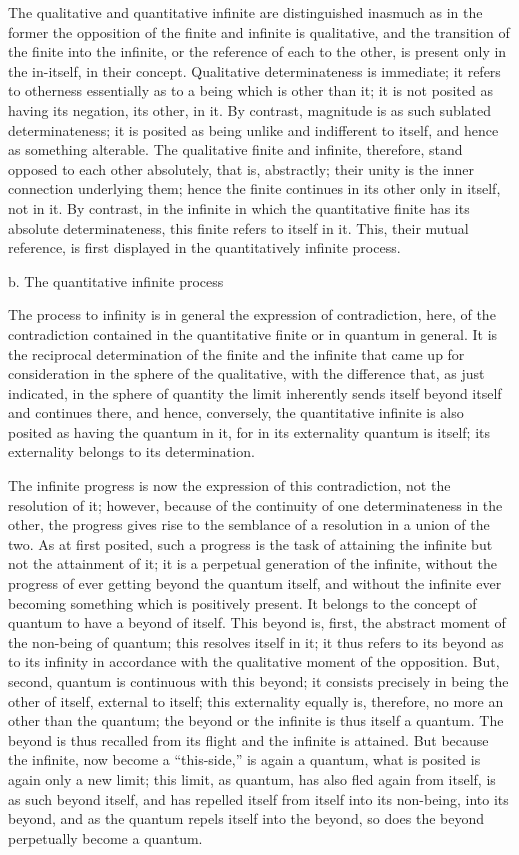 The qualitative and quantitative infinite are distinguished
inasmuch as in the former the opposition of
the finite and infinite is qualitative,
and the transition of the finite into the infinite,
or the reference of each to the other,
is present only in the in-itself, in their concept.
Qualitative determinateness is immediate;
it refers to otherness essentially as to
a being which is other than it;
it is not posited as having its negation, its other, in it.
By contrast, magnitude is as such sublated determinateness;
it is posited as being unlike and indifferent to itself,
and hence as something alterable.
The qualitative finite and infinite, therefore,
stand opposed to each other absolutely,
that is, abstractly;
their unity is the inner connection underlying them;
hence the finite continues in its other
only in itself, not in it.
By contrast, in the infinite in which
the quantitative finite has its absolute determinateness,
this finite refers to itself in it.
This, their mutual reference, is first displayed
in the quantitatively infinite process.

b. The quantitative infinite process

The process to infinity is in general the expression of contradiction,
here, of the contradiction contained in the quantitative finite
or in quantum in general.
It is the reciprocal determination of the finite and the infinite
that came up for consideration in the sphere of the qualitative,
with the difference that, as just indicated,
in the sphere of quantity the limit inherently
sends itself beyond itself and continues there,
and hence, conversely, the quantitative infinite is
also posited as having the quantum in it,
for in its externality quantum is itself;
its externality belongs to its determination.

The infinite progress is now
the expression of this contradiction,
not the resolution of it;
however, because of the continuity of
one determinateness in the other,
the progress gives rise to the semblance of
a resolution in a union of the two.
As at first posited, such a progress is
the task of attaining the infinite
but not the attainment of it;
it is a perpetual generation of the infinite,
without the progress of ever
getting  beyond the quantum itself,
and without the infinite ever becoming
something which is positively present.
It belongs to the concept of quantum
to have a beyond of itself.
This beyond is, first, the abstract moment
of the non-being of quantum;
this resolves itself in it;
it thus refers to its beyond as to its infinity in accordance
with the qualitative moment of the opposition.
But, second, quantum is continuous with this beyond;
it consists precisely in being the other of itself,
external to itself;
this externality equally is, therefore,
no more an other than the quantum;
the beyond or the infinite is thus itself a quantum.
The beyond is thus recalled from its flight
and the infinite is attained.
But because the infinite, now become a “this-side,”
is again a quantum,
what is posited is again only a new limit;
this limit, as quantum, has also fled again from itself,
is as such beyond itself,
and has repelled itself from itself
into its non-being, into its beyond,
and as the quantum repels itself into the beyond,
so does the beyond perpetually become a quantum.

